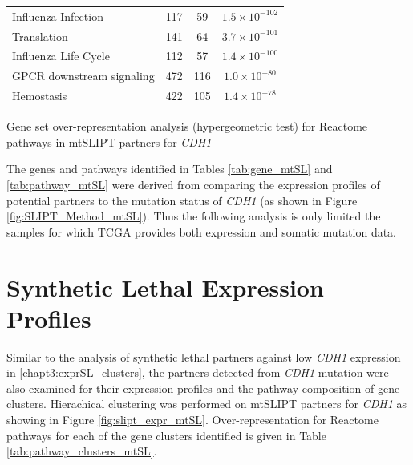 \begin{table}[!ht]
{\begin{threeparttable}
\begin{tabular}{lccc}
  \rowcolor{black!5}
  Influenza Infection & 117 &  59 & $1.5 \times 10^{-102}$ \\ 
  \rowcolor{black!10}
  Translation & 141 &  64 & $3.7 \times 10^{-101}$ \\ 
  \rowcolor{black!5}
  Influenza Life Cycle & 112 &  57 & $1.4 \times 10^{-100}$ \\ 
  \rowcolor{black!10}
  GPCR downstream signaling & 472 & 116 & $1.0 \times 10^{-80}$ \\ 
  \rowcolor{black!5}
  Hemostasis & 422 & 105 & $1.4 \times 10^{-78}$ \\ 
  \hline
\end{tabular}
\begin{tablenotes}
\raggedright \small
Gene set over-representation analysis (hypergeometric test) for Reactome pathways in mtSLIPT partners for \textit{CDH1}
\end{tablenotes}
\end{threeparttable}
}
\end{table}

\FloatBarrier

The genes and pathways identified in Tables \ref{tab:gene_mtSL} and \ref{tab:pathway_mtSL} were derived from comparing the expression profiles of potential partners to the mutation status of \textit{CDH1} (as shown in Figure \ref{fig:SLIPT_Method_mtSL}). Thus the following analysis is only limited the samples for which TCGA provides both expression and somatic mutation data.

\FloatBarrier

\section{Synthetic Lethal Expression Profiles} \label{appendix:mtSL_clusters}

Similar to the analysis of synthetic lethal partners against low \textit{CDH1} expression in \ref{chapt3:exprSL_clusters}, the partners detected from \textit{CDH1} mutation were also examined for their expression profiles and the pathway composition of gene clusters. Hierachical clustering was performed on mtSLIPT partners for \textit{CDH1} as showing in Figure \ref{fig:slipt_expr_mtSL}. Over-representation for Reactome pathways for each of the gene clusters identified is given in Table \ref{tab:pathway_clusters_mtSL}.

